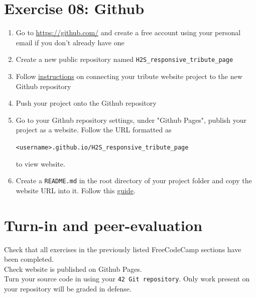 \documentclass{42-en}
\begin{document}
\chapter{Exercise 08: Github}

\exnumber{\exercicenumber}

\makeheaderfiles

\begin{enumerate}
    \item Go to \url{https://github.com/} and create a free account using your personal email if you don't already have one
    \item Create a new public repository named \texttt{H2S\_responsive\_tribute\_page}
    \item Follow \href{https://help.github.com/en/articles/adding-a-remote}{instructions} on connecting your tribute website project to the new Github repository
    \item Push your project onto the Github repository
    \item Go to your Github repository settings, under "Github Pages", publish your project as a website. Follow the URL formatted as
    \begin{center}
        \texttt{<username>.github.io/H2S\_responsive\_tribute\_page} \\
    \end{center}
    to view website.
    \item Create a \texttt{README.md} in the root directory of your project folder and copy the website URL into it. Follow this \href{https://help.github.com/en/articles/basic-writing-and-formatting-syntax#headings}{guide}.
\end{enumerate}

\chapter{Turn-in and peer-evaluation}

    Check that all exercises in the previously listed FreeCodeCamp sections have been completed.\\
    
    Check website is published on Github Pages.\\

    Turn your source code in using your \texttt{42 Git repository}. Only work present on your repository will be graded in defense.

\end{document}
